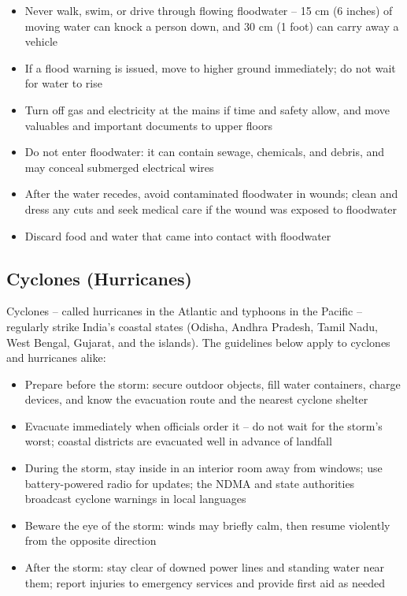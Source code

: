 \begin{itemize}
  \item Never walk, swim, or drive through flowing floodwater -- 15 cm (6 inches) of moving water can knock a person down, and 30 cm (1 foot) can carry away a vehicle
  \item If a flood warning is issued, move to higher ground immediately; do not wait for water to rise
  \item Turn off gas and electricity at the mains if time and safety allow, and move valuables and important documents to upper floors
  \item Do not enter floodwater: it can contain sewage, chemicals, and debris, and may conceal submerged electrical wires
  \item After the water recedes, avoid contaminated floodwater in wounds; clean and dress any cuts and seek medical care if the wound was exposed to floodwater
  \item Discard food and water that came into contact with floodwater
\end{itemize}

\subsection{Cyclones (Hurricanes)}

Cyclones -- called hurricanes in the Atlantic and typhoons in the Pacific -- regularly strike India's coastal states (Odisha, Andhra Pradesh, Tamil Nadu, West Bengal, Gujarat, and the islands). The guidelines below apply to cyclones and hurricanes alike:

\begin{itemize}
  \item Prepare before the storm: secure outdoor objects, fill water containers, charge devices, and know the evacuation route and the nearest cyclone shelter
  \item Evacuate immediately when officials order it -- do not wait for the storm's worst; coastal districts are evacuated well in advance of landfall
  \item During the storm, stay inside in an interior room away from windows; use battery-powered radio for updates; the NDMA and state authorities broadcast cyclone warnings in local languages
  \item Beware the eye of the storm: winds may briefly calm, then resume violently from the opposite direction
  \item After the storm: stay clear of downed power lines and standing water near them; report injuries to emergency services and provide first aid as needed
\end{itemize}

